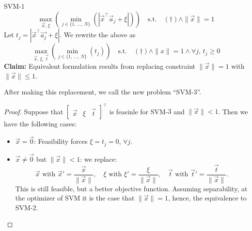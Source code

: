 \documentclass{article}
\begin{document}
SVM-$1$
\[
    \max_{\vec{x},\, \xi}\left(\min_{j \in \{1,\, \ldots,\, N\}}\left(\left|\vec{x}^\top \vec{a}_j + \xi\right|\right)\right) \quad \text{s.t.}  \quad (\dag) \wedge \|\vec{x}\| = 1
\]
Let $t_j = \left|\vec{x}^\top \vec{a_j} + \xi\right|$. We rewrite the above as
\[
    \max_{\vec{x},\, \xi,\, \vec{t}}\left(\min_{j \in \{1,\, \ldots,\, N\}}\left(t_j\right)\right) \quad \text{s.t.} \quad (\dag) \wedge \|x\| = 1 \wedge \forall j,\, t_j \geq 0
\]
\textbf{Claim:} Equivalent formulation results from replacing constraint $\|\vec{x}\| = 1$ with $\|\vec{x}\| \leq 1$.

After making this replacement, we call the new problem ``SVM-$3$''.

\begin{proof}
    Suppose that $\begin{bmatrix}
        \vec{x} & \xi & \vec{t}
    \end{bmatrix}^\top$ is feasinle for SVM-$3$ and $\|\vec{x}\| < 1$. Then we have the following cases:
    \begin{itemize}
        \item $\vec{x} = \vec{0}$: Feasibility forces $\xi = t_j = 0$, $\forall j$.
        \item $\vec{x} \neq \vec{0}$ but $\|\vec{x}\| < 1$: we replace:
        \[
            \vec{x} \text{ with } \vec{x}' = \frac{\vec{x}}{\|\vec{x}\|}, \quad \xi \text{ with } \xi' = \frac{\xi}{\|\vec{x}\|}, \quad \vec{t} \text{ with } \vec{t}' = \frac{\vec{t}}{\|\vec{x}\|}.
        \]
        This is still feasible, but a better objective function. Assuming separability, at the optimizer of SVM it is the case that $\|\vec{x}\| = 1$, hence, the equivalence to SVM-$2$.
    \end{itemize}
\end{proof}
\end{document}
